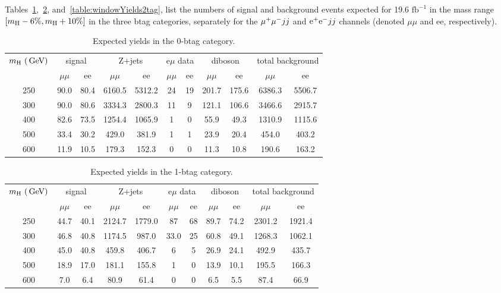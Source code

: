 
Tables~\ref{table:windowYields0tag},~\ref{table:windowYields1tag}, and~\ref{table:windowYields2tag}, list 
the numbers of signal and background events expected for 19.6 $\text{fb}^{-1}$
in the mass range $[m_{\mathrm{H}} -6\%, m_{\mathrm{H}}+10\%]$ in the three btag categories, separately for the $\mu^+\mu^- jj$
and $\mathrm{e^+e^-} jj$ channels (denoted $\mu\mu$ and ee, respectively).

\begin{table}[h!]
\caption{Expected yields in the 0-btag category.}
\label{table:windowYields0tag}
\centering
\begin{tabular}{|c|c|c|c|c|c|c|c|c|c|c|} \hline
    $m_{\mathrm{H}}~(\,\text{Ge\hspace{-.08em}V})$   & \multicolumn{2}{c|}{signal}      & \multicolumn{2}{c|}{Z+jets} & \multicolumn{2}{c|}{e$\mu$ data} & \multicolumn{2}{c|}{diboson} & \multicolumn{2}{c|}{total background} \\ \cline{2-11}
                 & $\mu\mu$ & ee &  $\mu\mu$ &  ee &  $\mu\mu$ &  ee &  $\mu\mu$ &  ee & $\mu\mu$ & ee \\\hline
    250  &  90.0 & 80.4 & 6160.5 & 5312.2 &24 & 19  &201.7 & 175.6 &6386.3 & 5506.7 \\
    300  &  90.0 & 80.6 & 3334.3 & 2800.3 & 11 & 9  &121.1 & 106.6 &3466.6 & 2915.7 \\
    400  &  82.6 & 73.5 & 1254.4 & 1065.9 & 1 & 0   & 55.9 & 49.3 & 1310.9 & 1115.6 \\
    500 &33.4 & 30.2 &429.0 & 381.9 &1 & 1  &23.9 & 20.4 &454.0 & 403.2 \\
    600&11.9 & 10.5 &179.3 & 152.3 &0 & 0  &11.3 & 10.8 &190.6 & 163.2 \\\hline
\end{tabular}
\end{table}

\begin{table}[h!]
\caption{Expected yields in the 1-btag category.}
\label{table:windowYields1tag}
\centering
\begin{tabular}{|c|c|c|c|c|c|c|c|c|c|c|} \hline
    $m_{\mathrm{H}}~(\,\text{Ge\hspace{-.08em}V})$   & \multicolumn{2}{c|}{signal}      & \multicolumn{2}{c|}{Z+jets} & \multicolumn{2}{c|}{e$\mu$ data} & \multicolumn{2}{c|}{diboson} & \multicolumn{2}{c|}{total background} \\ \cline{2-11}
                 & $\mu\mu$ & ee &  $\mu\mu$ &  ee &  $\mu\mu$ &  ee &  $\mu\mu$ &  ee & $\mu\mu$ & ee \\\hline
    250 & 44.7 & 40.1 &2124.7 & 1779.0 &87 & 68  &89.7 & 74.2 &2301.2 & 1921.4 \\
    300 & 46.8 & 40.8 &1174.5 & 987.0 &33.0 & 25  &60.8 & 49.1 &1268.3 & 1062.1 \\
    400&45.0 & 40.8 &459.8 & 406.7 &6 & 5  &26.9 & 24.1 &492.9 & 435.7 \\
    500&18.9 & 17.0 &181.1 & 155.8 &1 & 0  &13.9 & 10.1 &195.5 & 166.3 \\
    600 & 7.0 & 6.4 &80.9 & 61.4  &0 & 0  &6.5 & 5.5 &87.4 & 66.9 \\\hline
\end{tabular}
\end{table}

